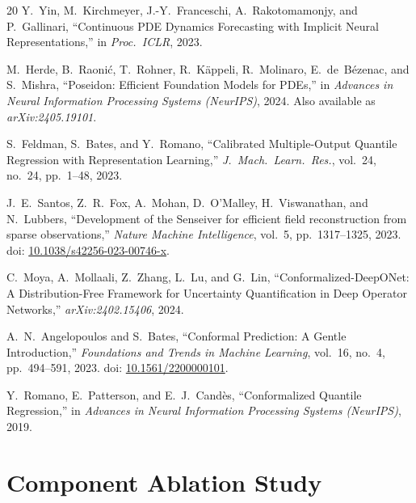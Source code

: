 \documentclass[11pt,a4paper]{article}
\begin{document}
\begin{thebibliography}{20}
Y.~Yin, M.~Kirchmeyer, J.-Y.~Franceschi, A.~Rakotomamonjy, and P.~Gallinari,
``Continuous PDE Dynamics Forecasting with Implicit Neural Representations,''
in \emph{Proc.\ ICLR}, 2023.

M.~Herde, B.~Raoni\'{c}, T.~Rohner, R.~K\"{a}ppeli, R.~Molinaro, E.~de~B\'{e}zenac, and S.~Mishra,
``Poseidon: Efficient Foundation Models for PDEs,''
in \emph{Advances in Neural Information Processing Systems (NeurIPS)}, 2024.
Also available as \emph{arXiv:2405.19101}.

S.~Feldman, S.~Bates, and Y.~Romano,
``Calibrated Multiple-Output Quantile Regression with Representation Learning,''
\textit{J.\ Mach.\ Learn.\ Res.}, vol.~24, no.~24, pp.~1--48, 2023.

J.~E.~Santos, Z.~R.~Fox, A.~Mohan, D.~O'Malley, H.~Viswanathan, and N.~Lubbers,
``Development of the Senseiver for efficient field reconstruction from sparse observations,''
\textit{Nature Machine Intelligence}, vol.~5, pp.~1317--1325, 2023.
doi: \href{https://doi.org/10.1038/s42256-023-00746-x}{10.1038/s42256-023-00746-x}.

C.~Moya, A.~Mollaali, Z.~Zhang, L.~Lu, and G.~Lin,
``Conformalized-DeepONet: A Distribution-Free Framework for Uncertainty Quantification in Deep Operator Networks,''
\emph{arXiv:2402.15406}, 2024.

A.~N.~Angelopoulos and S.~Bates,
``Conformal Prediction: A Gentle Introduction,''
\textit{Foundations and Trends in Machine Learning}, vol.~16, no.~4, pp.~494--591, 2023.
doi: \href{https://doi.org/10.1561/2200000101}{10.1561/2200000101}.

Y.~Romano, E.~Patterson, and E.~J.~Cand\`{e}s,
``Conformalized Quantile Regression,''
in \emph{Advances in Neural Information Processing Systems (NeurIPS)}, 2019.

\end{thebibliography}

\appendix
\section{Component Ablation Study}
\label{app:ablation}
\end{document}

